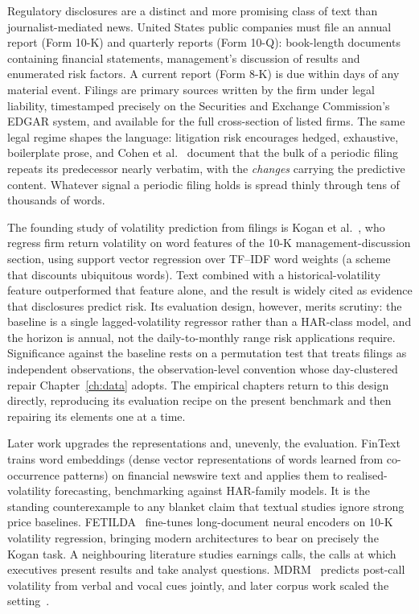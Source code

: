 Regulatory disclosures are a distinct and more promising class of text than journalist-mediated news. United States public companies must file an annual report (Form 10-K) and quarterly reports (Form 10-Q): book-length documents containing financial statements, management's discussion of results and enumerated risk factors. A current report (Form 8-K) is due within days of any material event. Filings are primary sources written by the firm under legal liability, timestamped precisely on the Securities and Exchange Commission's EDGAR system, and available for the full cross-section of listed firms. The same legal regime shapes the language: litigation risk encourages hedged, exhaustive, boilerplate prose, and Cohen et al.~\cite{cohen2020lazy} document that the bulk of a periodic filing repeats its predecessor nearly verbatim, with the \emph{changes} carrying the predictive content. Whatever signal a periodic filing holds is spread thinly through tens of thousands of words.

The founding study of volatility prediction from filings is Kogan et al.~\cite{kogan2009predicting}, who regress firm return volatility on word features of the 10-K management-discussion section, using support vector regression over TF--IDF word weights (a scheme that discounts ubiquitous words). Text combined with a historical-volatility feature outperformed that feature alone, and the result is widely cited as evidence that disclosures predict risk. Its evaluation design, however, merits scrutiny: the baseline is a single lagged-volatility regressor rather than a HAR-class model, and the horizon is annual, not the daily-to-monthly range risk applications require. Significance against the baseline rests on a permutation test that treats filings as independent observations, the observation-level convention whose day-clustered repair Chapter~\ref{ch:data} adopts. The empirical chapters return to this design directly, reproducing its evaluation recipe on the present benchmark and then repairing its elements one at a time. %

Later work upgrades the representations and, unevenly, the evaluation. FinText~\cite{rahimikia2021fintext} trains word embeddings (dense vector representations of words learned from co-occurrence patterns) on financial newswire text and applies them to realised-volatility forecasting, benchmarking against HAR-family models. It is the standing counterexample to any blanket claim that textual studies ignore strong price baselines. FETILDA~\cite{fetilda2022} fine-tunes long-document neural encoders on 10-K volatility regression, bringing modern architectures to bear on precisely the Kogan task. A neighbouring literature studies earnings calls, the calls at which executives present results and take analyst questions. MDRM~\cite{qin2019mdrm} predicts post-call volatility from verbal and vocal cues jointly, and later corpus work scaled the setting~\cite{maec2020}.

